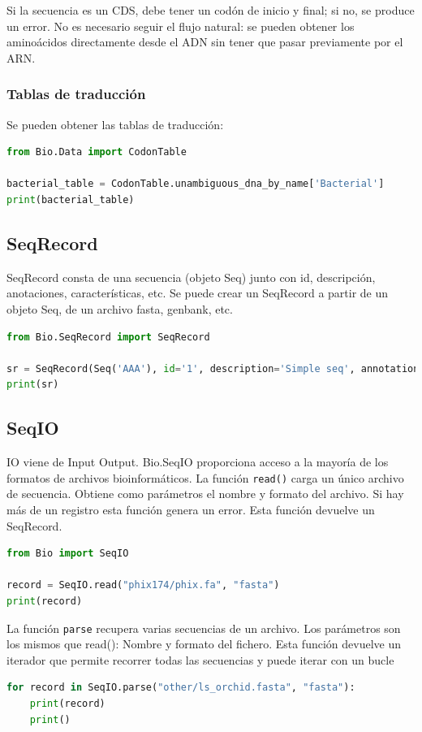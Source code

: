 Si la secuencia es un CDS, debe tener un codón de inicio y final; si no, se produce un error. No es necesario seguir el flujo natural: se pueden obtener los aminoácidos directamente desde el ADN sin tener que pasar previamente por el ARN.

\subsubsection{Tablas de traducción}
Se pueden obtener las tablas de traducción:
\begin{lstlisting}[language=Python]
from Bio.Data import CodonTable

bacterial_table = CodonTable.unambiguous_dna_by_name['Bacterial']
print(bacterial_table)
\end{lstlisting}

\subsection{SeqRecord}
SeqRecord consta de una secuencia (objeto Seq) junto con id, descripción, anotaciones, características, etc. Se puede crear un SeqRecord a partir de un objeto Seq, de un archivo fasta, genbank, etc.
\begin{lstlisting}[language=Python]
from Bio.SeqRecord import SeqRecord

sr = SeqRecord(Seq('AAA'), id='1', description='Simple seq', annotations={"molecule_type": "DNA"})
print(sr)
\end{lstlisting}

\subsection{SeqIO}
IO viene de Input Output. 
Bio.SeqIO proporciona acceso a la mayoría de los formatos de archivos bioinformáticos.
La función \texttt{read()} carga un único archivo de secuencia. Obtiene como parámetros el nombre y formato del archivo.
Si hay más de un registro esta función genera un error. Esta función devuelve un SeqRecord.
\begin{lstlisting}[language=Python]
from Bio import SeqIO

record = SeqIO.read("phix174/phix.fa", "fasta")
print(record)
\end{lstlisting}

La función \texttt{parse} recupera varias secuencias de un archivo. Los parámetros son los mismos que read(): Nombre y formato del fichero. Esta función devuelve un iterador que permite recorrer todas las secuencias y puede iterar con un bucle
\begin{lstlisting}[language=Python]
for record in SeqIO.parse("other/ls_orchid.fasta", "fasta"):
    print(record)
    print()
\end{lstlisting}

